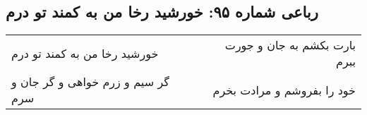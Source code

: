 \begin{center}
\section*{رباعی شماره ۹۵: خورشید رخا من به کمند تو درم}
\label{sec:095}
\begin{longtable}{l p{0.5cm} r}
خورشید رخا من به کمند تو درم
&&
بارت بکشم به جان و جورت ببرم
\\
گر سیم و زرم خواهی و گر جان و سرم
&&
خود را بفروشم و مرادت بخرم
\\
\end{longtable}
\end{center}

